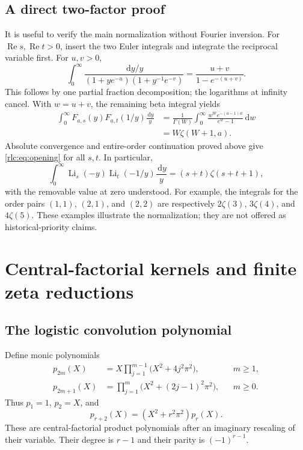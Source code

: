 \documentclass[11pt,a4paper]{article}
\numberwithin{equation}{section}
\theoremstyle{definition}\newtheorem{definition}[theorem]{Definition}
\theoremstyle{remark}\newtheorem{remark}[theorem]{Remark}
\DeclareMathOperator{\Li}{Li}
\DeclareMathOperator{\Rea}{Re}
\newcommand{\dd}{\,\mathrm d}
\begin{document}
\subsection{A direct two-factor proof}
It is useful to verify the main normalization without Fourier inversion.
For $\Rea s,\Rea t>0$, insert the two Euler integrals and integrate the
reciprocal variable first. For $u,v>0$,
\[
 \int_0^\infty
 \frac{\dd y/y}{(1+ye^{-u})(1+y^{-1}e^{-v})}
 =\frac{u+v}{1-e^{-(u+v)}}.
\]
This follows by one partial fraction decomposition; the logarithms at
infinity cancel. With $w=u+v$, the remaining beta integral yields
\begin{align*}
 \int_0^\infty F_{a,s}(y)F_{a,t}(1/y)\frac{\dd y}{y}
 &=\frac1{\Gamma(W)}\int_0^\infty
       \frac{w^W e^{-(a-1)w}}{e^w-1}\dd w\\
 &=W\zeta(W+1,a).
\end{align*}
Absolute convergence and entire-order continuation proved above give
\eqref{rlc:eq:opening} for all $s,t$. In particular,
\begin{equation}\label{rlc:eq:polylogpair}
 \int_0^\infty\Li_s(-y)\Li_t(-1/y)\frac{\dd y}{y}
     =(s+t)\zeta(s+t+1),
\end{equation}
with the removable value at zero understood. For example, the integrals
for the order pairs $(1,1)$, $(2,1)$, and $(2,2)$ are respectively
$2\zeta(3)$, $3\zeta(4)$, and $4\zeta(5)$.
These examples illustrate the normalization; they are not offered as
historical-priority claims.



\section{Central-factorial kernels and finite zeta reductions}
\label{rlc:sec:central}

\subsection{The logistic convolution polynomial}
Define monic polynomials
\begin{align}
 p_{2m}(X)&=X\prod_{j=1}^{m-1}\bigl(X^2+4j^2\pi^2\bigr),
          &&m\ge1,\label{rlc:eq:peven}\\
 p_{2m+1}(X)&=\prod_{j=1}^{m}\bigl(X^2+(2j-1)^2\pi^2\bigr),
          &&m\ge0.\label{rlc:eq:podd}
\end{align}
Thus $p_1=1$, $p_2=X$, and
\begin{equation}\label{rlc:eq:precurrence}
 p_{r+2}(X)=(X^2+r^2\pi^2)p_r(X).
\end{equation}
These are central-factorial product polynomials after an imaginary
rescaling of their variable. Their degree is $r-1$ and their parity
is $(-1)^{r-1}$.
\end{document}
